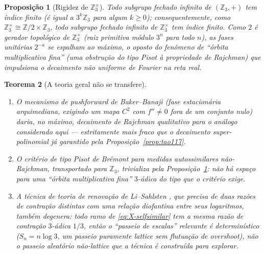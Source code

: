 \documentclass[11pt]{article}
\newtheorem{theorem}{Teorema}[section]
\newtheorem{proposition}[theorem]{Proposição}
\theoremstyle{definition}
\theoremstyle{remark}
\begin{document}
\begin{proposition}[Rigidez de $\mathbb{Z}_3^\times$]\label{prop:rigidity}
Todo subgrupo fechado infinito de $(\mathbb{Z}_3,+)$ tem índice finito
(é igual a $3^k\mathbb{Z}_3$ para algum $k\ge 0$); consequentemente,
como $\mathbb{Z}_3^\times\cong\mathbb{Z}/2\times\mathbb{Z}_3$, todo
subgrupo fechado infinito de $\mathbb{Z}_3^\times$ tem índice finito.
Como $2$ é gerador topológico de $\mathbb{Z}_3^\times$ (raiz primitiva
módulo $3^n$ para todo $n$), as fases unitárias $2^{-a}$ se espalham ao
máximo, o oposto do fenômeno de ``órbita multiplicativa fina'' (uma
obstrução do tipo Pisot à propriedade de Rajchman) que impulsiona o
decaimento não uniforme de Fourier na reta real.
\end{proposition}

\begin{theorem}[A teoria geral não se transfere]\label{thm:no-transfer}
\begin{enumerate}[label=(\alph*)]
\item O mecanismo de pushforward de Baker--Banaji
  \cite{BakerBanaji2026} (fase estacionária arquimediana, exigindo um
  mapa $C^2$ com $f''\ne 0$ fora de um conjunto nulo) daria, no
  máximo, decaimento de Rajchman \emph{qualitativo} para o análogo
  considerado aqui --- estritamente mais fraco que o decaimento
  super-polinomial já garantido pela Proposição~\ref{prop:tao117}.
\item O critério de tipo Pisot de Brémont para medidas autossimilares
  não-Rajchman, transportado para $\mathbb{Z}_3$, trivializa pela
  Proposição~\ref{prop:rigidity}: não há espaço para uma ``órbita
  multiplicativa fina'' $3$-ádica do tipo que o critério exige.
\item A técnica de teoria de renovação de Li--Sahlsten
  \cite{LiSahlsten2022}, que precisa de \emph{duas} razões de
  contração distintas com uma relação diofantina entre seus
  logaritmos, também degenera: todo ramo de \eqref{eq:X-selfsimilar}
  tem a \emph{mesma} razão de contração $3$-ádica $1/3$, então o
  ``passeio de escalas'' relevante é determinístico ($S_n = n\log 3$,
  um passeio puramente lattice sem flutuação de overshoot), não o
  passeio aleatório não-lattice que a técnica é construída para
  explorar.
\end{enumerate}
\end{theorem}
\end{document}

